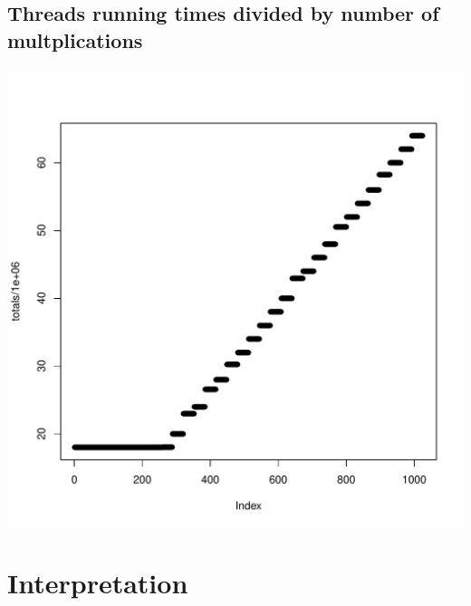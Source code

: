 \documentclass{article}
\begin{document}
	\subsection{Threads running times divided by number of multplications}
	\includegraphics[width=\linewidth]{"latency_estimate"}
	\pagebreak

\section{Interpretation}
\end{document}
